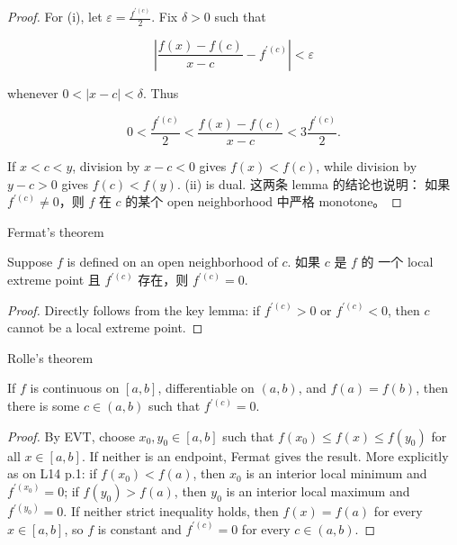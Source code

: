 \begin{proof}

For (i), let \(\varepsilon = \frac{f^{'{(c)}}}{2}\). Fix \(\delta > 0\) such that

\[\left| {\frac{f(x) - f(c)}{x - c} - f^{'{(c)}}} \right| < \varepsilon\]

whenever \(0 < \left| {x - c} \right| < \delta\). Thus

\[0 < \frac{f^{'{(c)}}}{2} < \frac{f(x) - f(c)}{x - c} < 3\frac{f^{'{(c)}}}{2}.\]

If \(x < c < y\), division by \(x - c < 0\) gives \(f(x) < f(c)\), while division by \(y - c > 0\) gives \(f(c) < f(y)\). (ii) is dual. 这两条 lemma 的结论也说明： 如果 \(f^{'{(c)}} \neq 0\)，则 \(f\) 在 \(c\) 的某个 open neighborhood 中严格 monotone。

\end{proof}

\begin{corollary}{Fermat's theorem}

Suppose \(f\) is defined on an open neighborhood of \(c\). 如果 \(c\) 是 \(f\) 的 一个 local extreme point 且 \(f^{'{(c)}}\) 存在，则 \(f^{'{(c)}} = 0\).

\end{corollary}

\begin{proof}

Directly follows from the key lemma: if \(f^{'{(c)}} > 0\) or \(f^{'{(c)}} < 0\), then \(c\) cannot be a local extreme point.

\end{proof}

\begin{corollary}{Rolle's theorem}

If \(f\) is continuous on \(\left\lbrack {a,b} \right\rbrack\), differentiable on \(\left( {a,b} \right)\), and \(f(a) = f(b)\), then there is some \(c \in \left( {a,b} \right)\) such that \(f^{'{(c)}} = 0\).

\end{corollary}

\begin{proof}

By EVT, choose \(x_{0},y_{0} \in \left\lbrack {a,b} \right\rbrack\) such that \(f\left( x_{0} \right) \leq f(x) \leq f\left( y_{0} \right)\) for all \(x \in \left\lbrack {a,b} \right\rbrack\). If neither is an endpoint, Fermat gives the result. More explicitly as on L14 p.1: if \(f\left( x_{0} \right) < f(a)\), then \(x_{0}\) is an interior local minimum and \(f^{'{(x_{0})}} = 0\); if \(f\left( y_{0} \right) > f(a)\), then \(y_{0}\) is an interior local maximum and \(f^{'{(y_{0})}} = 0\). If neither strict inequality holds, then \(f(x) = f(a)\) for every \(x \in \left\lbrack {a,b} \right\rbrack\), so \(f\) is constant and \(f^{'{(c)}} = 0\) for every \(c \in \left( {a,b} \right)\).

\end{proof}

